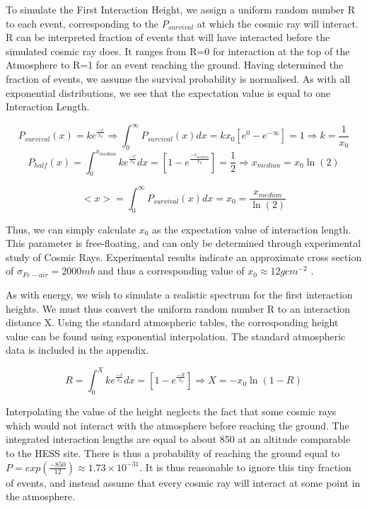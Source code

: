 \documentclass[11pt]{article}
\begin{document}
To simulate the First Interaction Height, we assign a uniform random number R to each event, corresponding to the $P_{survival}$ at which the cosmic ray will interact. R can be interpreted fraction of events that will have interacted before the simulated cosmic ray does. It ranges from R=0 for interaction at the top of the Atmosphere to R=1 for an event reaching the ground. Having determined the fraction of events, we assume the survival probability is normalised. As with all exponential distributions, we see that the expectation value is equal to one Interaction Length.

\[ P_{survival}(x) = k e^{\frac{-x}{x_{0}}} \Longrightarrow \int_{0}^{\infty} P_{survival}(x) dx = k x_{0} [ e^{0} - e ^ {- \infty}] = 1 \Longrightarrow k = \frac{1}{x_{0}}\]
\[P_{half}(x) =\int_{0}^{x_{median}} k e^{\frac{-x}{x_{0}}} dx =[1 -e^{\frac{-x_{median}}{x_{0}}} ]= \frac{1}{2} \Longrightarrow {x_{median}} = x_{0} \ln (2)\]

\[ <x> =  \int_{0}^{\infty} P_{survival}(x) dx = x_{0} = \frac{x_{median}}{\ln (2)} \]

Thus, we can simply calculate $x_{0}$ as the expectation value of interaction length. This parameter is free-floating, and can only be determined through experimental study of Cosmic Rays. Experimental results indicate an approximate cross section of $\sigma_{Fe-air} = 2000mb$ and thus a corresponding value of $x_{0} \approx 12 g cm^{-2}$ \cite{Montanus2013}. 

As with energy, we wish to simulate a realistic spectrum for the first interaction heights. We must thus convert the uniform random number R to an interaction distance X. Using the standard atmospheric tables, the corresponding height value can be found using exponential interpolation. The standard atmospheric data is included in the appendix.

\[ R = \int_{0}^{X} k e^{\frac{-x}{x_{0}}} dx = [1 -e^{\frac{-X}{x_{0}}}] \Longrightarrow X = -x_{0} \ln (1 - R) \] 

Interpolating the value of the height neglects the fact that some cosmic rays which would not interact with the atmosphere before reaching the ground. The integrated interaction lengths are equal to about 850 at an altitude comparable to the HESS site. There is thus a probability of reaching the ground equal to $P = exp(\frac{-850}{12}) \approx 1.73 \times 10 ^{-31}$. It is thus reasonable to ignore this tiny fraction of events, and instead assume that every cosmic ray will interact at some point in the atmosphere.
\end{document}
